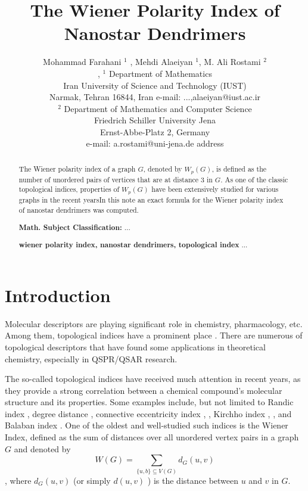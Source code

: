 \documentclass[12pt]{article}
\theoremstyle{theorem}
\theoremstyle{defi}
\begin{document}

\title{The Wiener Polarity Index of Nanostar Dendrimers}

\author{Mohammad Farahani $^1$ , Mehdi  Alaeiyan $^1$, M. Ali Rostami $^2$\\[6pt], 
$^1$ Department of Mathematics\\ Iran University of Science and Technology (IUST)\\ Narmak, Tehran 16844, Iran
e-mail: ...,alaeiyan@iust.ac.ir\\[6pt]
$^2$ Department of Mathematics and Computer Science\\ Friedrich Schiller University Jena\\
Ernst-Abbe-Platz 2, Germany \\ e-mail: a.rostami@uni-jena.de
address}


\maketitle

\begin{abstract}

The Wiener polarity index of a graph $G$, denoted by $W_p (G)$, is defined as the number of unordered pairs of vertices that are at distance $3$ in $G$. As one of the classic topological indices, properties of $W_p (G)$ have been extensively studied for various graphs in the recent yearsIn this note an exact formula for the Wiener polarity index of nanostar dendrimers was computed.

\medskip

{\bf Math. Subject Classification:} ...

{\bf wiener polarity index, nanostar dendrimers, topological index} ...

\end{abstract}

\section{Introduction}
Molecular descriptors are playing significant role in chemistry, pharmacology, etc. Among them, topological indices have a prominent place \cite{1}. There are numerous of topological descriptors that have found some applications in theoretical chemistry, especially in QSPR/QSAR research. 

The so-called topological indices have received much attention in recent years, as they provide a strong correlation between a chemical compound's molecular structure and its properties. Some examples include, but not limited to Randic index \cite{2}, degree distance \cite{3}, connective eccentricity index \cite{4}, \cite{5}, Kirchho index \cite{6} , \cite{7}, and Balaban index \cite{8}. One of the oldest and well-studied such indices is the Wiener Index, defined as the sum of distances over all unordered vertex pairs in a graph $G$ \cite{9} and denoted by 
$$W(G) = \sum_{\{u,b\}\subseteq V(G)} d_G (u,v)$$,
where $d_G (u,v)$ (or simply $d (u,v)$ ) is the distance between $u$ and $v$ in $G$.
\end{document}
